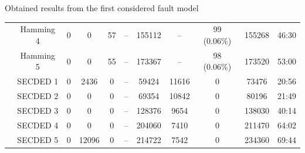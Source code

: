 \begin{frame}{Obtained results from the first considered fault model}
\begin{table}[H]
\begin{tabular}{@{}ccccccccccc@{}}
                                                               & Hamming 4     & 0     & 0           & 57         & --          & \num{155112}                             & --                                      & 99  {\tiny (0.06\%)}        & \num{155268} & 46:30                                   \\
                                                               & Hamming 5     & 0     & 0           & 55         & --          & \num{173367}                             & --                                      & 98  {\tiny (0.06\%)}        & \num{173520} & 53:00                                   \\
                                                               & SECDED 1      & 0     & 2436        & 0          & --          & \num{59424 }                             & \num{11616}                             & 0                           & \num{73476 } & 20:56                                   \\
                                                               & SECDED 2      & 0     & 0           & 0          & --          & \num{69354 }                             & \num{10842}                             & 0                           & \num{80196 } & 21:49                                   \\
                                                               & SECDED 3      & 0     & 0           & 0          & --          & \num{128376}                             & \num{9654 }                             & 0                           & \num{138030} & 40:14                                   \\
                                                               & SECDED 4      & 0     & 0           & 0          & --          & \num{204060}                             & \num{7410 }                             & 0                           & \num{211470} & 64:02                                   \\
                                                               & SECDED 5      & 0     & \num{12096} & 0          & --          & \num{214722}                             & \num{7542 }                             & 0                           & \num{234360} & 69:44                                   \\
            \bottomrule
        \end{tabular}
    \end{table}
\end{frame}

